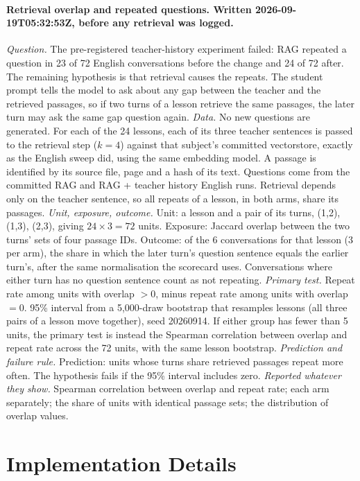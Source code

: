 \documentclass[pdflatex,sn-mathphys-num]{sn-jnl}%
\theoremstyle{thmstyleone}%
\theoremstyle{thmstyletwo}%
\theoremstyle{thmstylethree}%
\begin{document}
\begin{appendices}
\paragraph{Retrieval overlap and repeated questions. Written 2026-09-19T05:32:53Z, before any
retrieval was logged.} \emph{Question.} The pre-registered teacher-history experiment failed: RAG
repeated a question in 23 of 72 English conversations before the change and 24 of 72 after. The
remaining hypothesis is that retrieval causes the repeats. The student prompt tells the model to ask
about any gap between the teacher and the retrieved passages, so if two turns of a lesson retrieve the
same passages, the later turn may ask the same gap question again.
\emph{Data.} No new questions are generated. For each of the 24 lessons, each of its three teacher
sentences is passed to the retrieval step ($k=4$) against that subject's committed vectorstore,
exactly as the English sweep did, using the same embedding model. A passage is identified by its
source file, page and a hash of its text. Questions come from the committed RAG and RAG + teacher
history English runs. Retrieval depends only on the teacher sentence, so all repeats of a lesson, in
both arms, share its passages.
\emph{Unit, exposure, outcome.} Unit: a lesson and a pair of its turns, (1,2), (1,3), (2,3), giving
$24 \times 3 = 72$ units. Exposure: Jaccard overlap between the two turns' sets of four passage IDs.
Outcome: of the 6 conversations for that lesson (3 per arm), the share in which the later turn's
question sentence equals the earlier turn's, after the same normalisation the scorecard uses.
Conversations where either turn has no question sentence count as not repeating.
\emph{Primary test.} Repeat rate among units with overlap $> 0$, minus repeat rate among units with
overlap $= 0$. 95\% interval from a 5,000-draw bootstrap that resamples lessons (all three pairs of a
lesson move together), seed 20260914. If either group has fewer than 5 units, the primary test is
instead the Spearman correlation between overlap and repeat rate across the 72 units, with the same
lesson bootstrap.
\emph{Prediction and failure rule.} Prediction: units whose turns share retrieved passages repeat more
often. The hypothesis fails if the 95\% interval includes zero.
\emph{Reported whatever they show.} Spearman correlation between overlap and repeat rate; each arm
separately; the share of units with identical passage sets; the distribution of overlap values.

\section{Implementation Details}\label{app:implementation}


\end{appendices}
\end{document}
